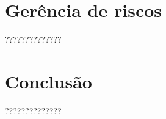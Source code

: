 \documentclass[12pt]{article}
\begin{document}
    \section{Gerência de riscos}
        ??????????????
    \section{Conclusão}
        ??????????????

    \nocite{*}
    
    
\end{document}
